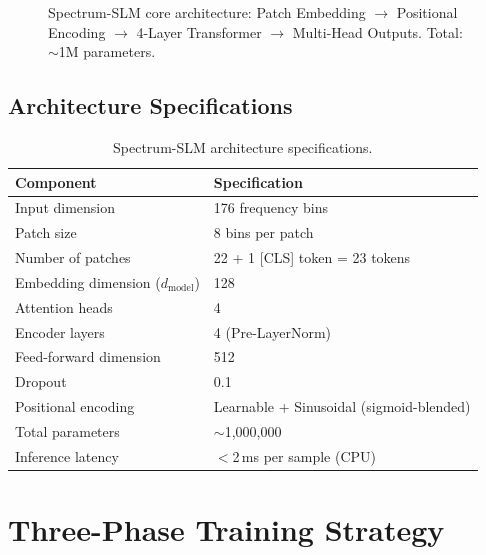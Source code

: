 \documentclass[12pt,a4paper]{article}
\begin{document}
\begin{figure}[H]
{%
}%
\caption{Spectrum-SLM core architecture: Patch Embedding $\to$ Positional Encoding $\to$ 4-Layer Transformer $\to$ Multi-Head Outputs. Total: $\sim$1M parameters.}
\end{figure}

\subsection{Architecture Specifications}

\begin{table}[H]\centering
\begin{tabular}{@{}ll@{}}\toprule
\textbf{Component} & \textbf{Specification} \\\midrule
Input dimension & 176 frequency bins \\
Patch size & 8 bins per patch \\
Number of patches & 22 + 1 [CLS] token = 23 tokens \\
Embedding dimension ($d_{\text{model}}$) & 128 \\
Attention heads & 4 \\
Encoder layers & 4 (Pre-LayerNorm) \\
Feed-forward dimension & 512 \\
Dropout & 0.1 \\
Positional encoding & Learnable + Sinusoidal (sigmoid-blended) \\
Total parameters & $\sim$1,000,000 \\
Inference latency & $<$2\,ms per sample (CPU) \\
\bottomrule
\end{tabular}
\caption{Spectrum-SLM architecture specifications.}
\end{table}

\section{Three-Phase Training Strategy}
\end{document}
